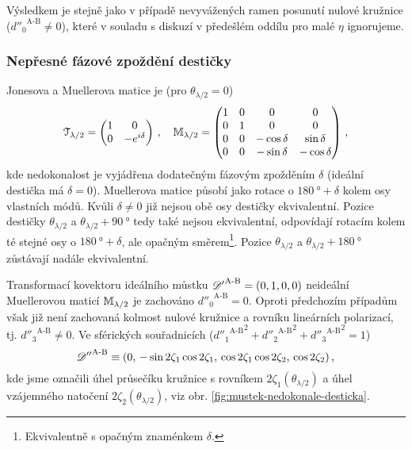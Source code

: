 Výsledkem je stejně jako v případě nevyvážených ramen posunutí nulové kružnice (${d''_0}^\textrm{A-B}\neq0$), které v souladu s diskuzí v předešlém oddílu pro malé $\eta$ ignorujeme.

\subsubsection*{Nepřesné fázové zpoždění destičky}
Jonesova a Muellerova matice je (pro $\theta_{\lambda/2}=0$)
\begin{equation}
    \mathcal{T}_{\lambda/2} = \begin{pmatrix} 1&0 \\ 0&-e^{i\delta} \end{pmatrix} \,, \quad
    \mathbb{M}_{\lambda/2} = \begin{pmatrix} 1&0&0&0 \\ 0&1&0&0 \\ 0&0&-\cos\delta&\sin\delta \\ 0&0&-\sin\delta&-\cos\delta \end{pmatrix} \,,
\end{equation}
kde nedokonalost je vyjádřena dodatečným fázovým zpožděním $\delta$ (ideální destička má $\delta=0$).
Muellerova matice působí jako rotace o $\SI{180}{\degree}+\delta$ kolem osy vlastních módů.
Kvůli $\delta\neq0$ již nejsou obě osy destičky ekvivalentní.
Pozice destičky $\theta_{\lambda/2}$ a $\theta_{\lambda/2}+\SI{90}{\degree}$ tedy také nejsou ekvivalentní, odpovídají rotacím kolem té stejné osy o $\SI{180}{\degree}+\delta$, ale opačným směrem\footnote{Ekvivalentně s opačným znaménkem $\delta$.}.
Pozice $\theta_{\lambda/2}$ a $\theta_{\lambda/2}+\SI{180}{\degree}$ zůstávají nadále ekvivalentní.

Transformací kovektoru ideálního můstku ${\mathscr{D}'}^\textrm{A-B}=(0, 1, 0, 0)$ neideální Muellerovou maticí $\mathbb{M}_{\lambda/2}$ je zachováno ${d''_0}^\textrm{A-B}=0$.
Oproti předchozím případům však již není zachovaná kolmost nulové kružnice a rovníku lineárních polarizací, tj. ${d''_3}^\textrm{A-B}\neq0$.
Ve sférických souřadnicích (${{d''_1}^\textrm{A-B}}^2+{{d''_2}^\textrm{A-B}}^2+{{d''_3}^\textrm{A-B}}^2=1$)
\begin{equation}
    {\mathscr{D}''}^\textrm{A-B} \equiv (0,\, -\sin2\zeta_1\cos2\zeta_1,\, \cos2\zeta_1\cos2\zeta_2,\, \cos2\zeta_2) \,,
\end{equation}
kde jsme označili úhel průsečíku kružnice s rovníkem $2\zeta_1(\theta_{\lambda/2})$ a úhel vzájemného natočení $2\zeta_2(\theta_{\lambda/2})$, viz obr. \ref{fig:mustek-nedokonale-desticka}.

